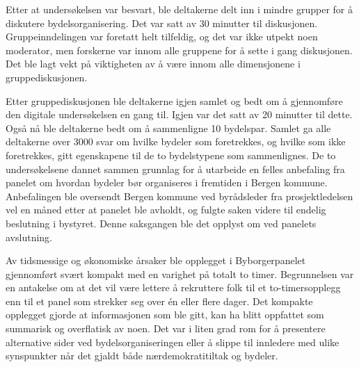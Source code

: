 \documentclass[
  12pt,
  a4paper, 12pt]{article}
\begin{document}
Etter at undersøkelsen var besvart, ble deltakerne delt inn i mindre grupper for å diskutere bydelsorganisering. Det var satt av 30 minutter til diskusjonen. Gruppeinndelingen var foretatt helt tilfeldig, og det var ikke utpekt noen moderator, men forskerne var innom alle gruppene for å sette i gang diskusjonen. Det ble lagt vekt på viktigheten av å være innom alle dimensjonene i gruppediskusjonen.

Etter gruppediskusjonen ble deltakerne igjen samlet og bedt om å gjennomføre den digitale undersøkelsen en gang til. Igjen var det satt av 20 minutter til dette. Også nå ble deltakerne bedt om å sammenligne 10 bydelspar. Samlet ga alle deltakerne over 3000 svar om hvilke bydeler som foretrekkes, og hvilke som ikke foretrekkes, gitt egenskapene til de to bydelstypene som sammenlignes. De to undersøkelsene dannet sammen grunnlag for å utarbeide en felles anbefaling fra panelet om hvordan bydeler bør organiseres i fremtiden i Bergen kommune. Anbefalingen ble oversendt Bergen kommune ved byrådsleder fra prosjektledelsen vel en måned etter at panelet ble avholdt, og fulgte saken videre til endelig beslutning i bystyret. Denne saksgangen ble det opplyst om ved panelets avslutning.

Av tidsmessige og økonomiske årsaker ble opplegget i Byborgerpanelet gjennomført svært kompakt med en varighet på totalt to timer. Begrunnelsen var en antakelse om at det vil være lettere å rekruttere folk til et to-timersopplegg enn til et panel som strekker seg over én eller flere dager. Det kompakte opplegget gjorde at informasjonen som ble gitt, kan ha blitt oppfattet som summarisk og overflatisk av noen. Det var i liten grad rom for å presentere alternative sider ved bydelsorganiseringen eller å slippe til innledere med ulike synspunkter når det gjaldt både nærdemokratitiltak og bydeler.
\end{document}
